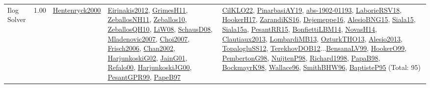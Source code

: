 {\begin{longtable}{p{3cm}r>{\raggedright\arraybackslash}p{6cm}>{\raggedright\arraybackslash}p{6cm}>{\raggedright\arraybackslash}p{8cm}}
\index{Ilog Solver}\index{CPSystems!Ilog Solver}Ilog Solver &  1.00 & \hyperref[detail:Hentenryck2000]{Hentenryck2000} & \hyperref[detail:Eirinakis2012]{Eirinakis2012}, \hyperref[detail:GrimesH11]{GrimesH11}, \hyperref[detail:ZeballosNH11]{ZeballosNH11}, \hyperref[detail:Zeballos10]{Zeballos10}, \hyperref[detail:ZeballosQH10]{ZeballosQH10}, \hyperref[detail:LiW08]{LiW08}, \hyperref[detail:SchausD08]{SchausD08}, \hyperref[detail:Mladenovic2007]{Mladenovic2007}, \hyperref[detail:Choi2007]{Choi2007}, \hyperref[detail:Frisch2006]{Frisch2006}, \hyperref[detail:Chan2002]{Chan2002}, \hyperref[detail:HarjunkoskiG02]{HarjunkoskiG02}, \hyperref[detail:JainG01]{JainG01}, \hyperref[detail:Refalo00]{Refalo00}, \hyperref[detail:HarjunkoskiJG00]{HarjunkoskiJG00}, \hyperref[detail:PesantGPR99]{PesantGPR99}, \hyperref[detail:PapeB97]{PapeB97} & \hyperref[detail:CilKLO22]{CilKLO22}, \hyperref[detail:PinarbasiAY19]{PinarbasiAY19}, \hyperref[detail:abs-1902-01193]{abs-1902-01193}, \hyperref[detail:LaborieRSV18]{LaborieRSV18}, \hyperref[detail:HookerH17]{HookerH17}, \hyperref[detail:ZarandiKS16]{ZarandiKS16}, \hyperref[detail:Dejemeppe16]{Dejemeppe16}, \hyperref[detail:AlesioBNG15]{AlesioBNG15}, \hyperref[detail:Siala15]{Siala15}, \hyperref[detail:Siala15a]{Siala15a}, \hyperref[detail:PesantRR15]{PesantRR15}, \hyperref[detail:BonfiettiLBM14]{BonfiettiLBM14}, \hyperref[detail:NovasH14]{NovasH14}, \hyperref[detail:Clautiaux2013]{Clautiaux2013}, \hyperref[detail:LombardiMB13]{LombardiMB13}, \hyperref[detail:OzturkTHO13]{OzturkTHO13}, \hyperref[detail:Alesio2013]{Alesio2013}, \hyperref[detail:TopalogluSS12]{TopalogluSS12}, \hyperref[detail:TerekhovDOB12]{TerekhovDOB12}...\hyperref[detail:BensanaLV99]{BensanaLV99}, \hyperref[detail:HookerO99]{HookerO99}, \hyperref[detail:PembertonG98]{PembertonG98}, \hyperref[detail:NuijtenP98]{NuijtenP98}, \hyperref[detail:Richard1998]{Richard1998}, \hyperref[detail:PapaB98]{PapaB98}, \hyperref[detail:BockmayrK98]{BockmayrK98}, \hyperref[detail:Wallace96]{Wallace96}, \hyperref[detail:SmithBHW96]{SmithBHW96}, \hyperref[detail:BaptisteP95]{BaptisteP95} (Total: 95)\\

\end{longtable}}
